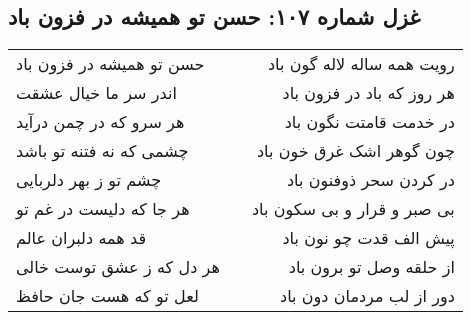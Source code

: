 \begin{center}
\section*{غزل شماره ۱۰۷: حسن تو همیشه در فزون باد}
\label{sec:sh107}
\begin{longtable}{l p{0.5cm} r}
حسن تو همیشه در فزون باد
&&
رویت همه ساله لاله گون باد
\\
اندر سر ما خیال عشقت
&&
هر روز که باد در فزون باد
\\
هر سرو که در چمن درآید
&&
در خدمت قامتت نگون باد
\\
چشمی که نه فتنه تو باشد
&&
چون گوهر اشک غرق خون باد
\\
چشم تو ز بهر دلربایی
&&
در کردن سحر ذوفنون باد
\\
هر جا که دلیست در غم تو
&&
بی صبر و قرار و بی سکون باد
\\
قد همه دلبران عالم
&&
پیش الف قدت چو نون باد
\\
هر دل که ز عشق توست خالی
&&
از حلقه وصل تو برون باد
\\
لعل تو که هست جان حافظ
&&
دور از لب مردمان دون باد
\\
\end{longtable}
\end{center}
